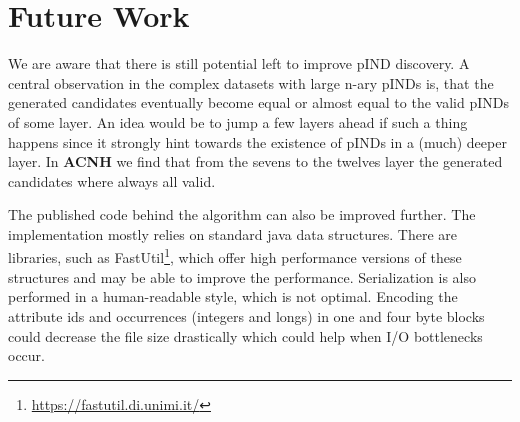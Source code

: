 \section{Future Work}
We are aware that there is still potential left to improve pIND discovery. A central observation in the complex datasets with large n-ary pINDs is, that the generated candidates eventually become equal or almost equal to the valid pINDs of some layer. An idea would be to jump a few layers ahead if such a thing happens since it strongly hint towards the existence of pINDs in a (much) deeper layer. In \textbf{ACNH} we find that from the sevens to the twelves layer the generated candidates where always all valid.

The published code behind the algorithm can also be improved further. The implementation mostly relies on standard java data structures. There are libraries, such as FastUtil\footnote{\url{https://fastutil.di.unimi.it/}}, which offer high performance versions of these structures and may be able to improve the performance. Serialization is also performed in a human-readable style, which is not optimal. Encoding the attribute ids and occurrences (integers and longs) in one and four byte blocks could decrease the file size drastically which could help when I/O bottlenecks occur.